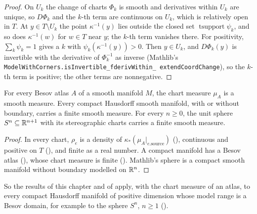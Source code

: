 \begin{proof}
\leanok
On $U_k$ the change of charts $\Phi_k$ is smooth and derivatives within $U_k$ are unique, so
$D\Phi_k$ and the $k$-th term are continuous on $U_k$, which is relatively open in $T$. At
$y \in T \setminus U_k$ the point $\kappa^{-1}(y)$ lies outside the closed set
$\operatorname{tsupport} \psi_k$, and so does $\kappa^{-1}(w)$ for $w \in T$ near $y$; the $k$-th
term vanishes there. For positivity, $\sum_k \psi_k = 1$ gives a $k$ with
$\psi_k(\kappa^{-1}(y)) > 0$. Then $y \in U_k$, and $D\Phi_k(y)$ is invertible with the derivative
of $\Phi_k^{-1}$ as inverse (Mathlib's
\texttt{ModelWithCorners.\allowbreak isInvertible\_\allowbreak fderivWithin\_\allowbreak
extendCoordChange}), so the $k$-th term is positive; the other terms are nonnegative.
\end{proof}

\begin{theorem}
\label{thm:smooth-measure-exists}
\leanok
{}
For every Besov atlas $A$ of a smooth manifold $M$, the chart measure $\mu_A$ is a smooth
measure. Every compact Hausdorff smooth manifold, with or without boundary, carries a finite
smooth measure. For every $n \geq 0$, the unit sphere $S^n \subseteq \mathbb{R}^{n+1}$ with its
stereographic charts carries a finite smooth measure.
\end{theorem}

\begin{proof}
\leanok
In every chart, $\rho_e$ is a density of $\kappa_* (\mu_A|_{e.\mathrm{source}})$
(), continuous and positive on $T$
(), and finite as a real number. A compact manifold has a Besov
atlas (), whose chart measure is finite ().
Mathlib's sphere is a compact smooth manifold without boundary modelled on $\mathbb{R}^n$.
\end{proof}

So the results of this chapter and of  apply, with the chart
measure of an atlas, to every compact Hausdorff manifold of positive dimension whose model range
is a Besov domain, for example to the sphere $S^n$, $n \geq 1$ ().

